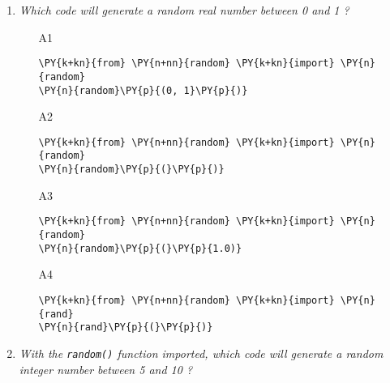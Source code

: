 \begin{enumerate}
\vspace{6mm}

\item {\em Which code will generate a random real number between 0 and 1 ? }\\

\begin{enumerate}
\item[A1] 
\begin{Verbatim}[commandchars=\\\{\}]
\PY{k+kn}{from} \PY{n+nn}{random} \PY{k+kn}{import} \PY{n}{random}
\PY{n}{random}\PY{p}{(0, 1}\PY{p}{)}
\end{Verbatim}
\item[A2]
\begin{Verbatim}[commandchars=\\\{\}]
\PY{k+kn}{from} \PY{n+nn}{random} \PY{k+kn}{import} \PY{n}{random}
\PY{n}{random}\PY{p}{(}\PY{p}{)}
\end{Verbatim}
\item[A3]
\begin{Verbatim}[commandchars=\\\{\}]
\PY{k+kn}{from} \PY{n+nn}{random} \PY{k+kn}{import} \PY{n}{random}
\PY{n}{random}\PY{p}{(}\PY{p}{1.0)}
\end{Verbatim}
\item[A4]
\begin{Verbatim}[commandchars=\\\{\}]
\PY{k+kn}{from} \PY{n+nn}{random} \PY{k+kn}{import} \PY{n}{rand}
\PY{n}{rand}\PY{p}{(}\PY{p}{)}
\end{Verbatim}
\end{enumerate}

\vspace{6mm}

\item {\em With the {\tt random()} function imported, which code will generate 
a random integer number between 5 and 10 ? }\\


\end{enumerate}

